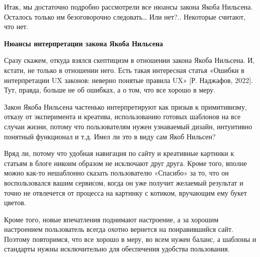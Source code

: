 Итак, мы достаточно подробно рассмотрели все нюансы закона Якоба Нильсена. Осталось только им безоговорочно следовать… Или нет?.. Некоторые считают, что нет.


\textbf{Нюансы интерпретации закона Якоба Нильсена}

Сразу скажем, откуда взялся скептицизм в отношении закона Якоба Нильсена. И, кстати, не только в отношении него. Есть такая интересная статья «Ошибки в интерпретации UX законов: неверно понятые правила UX» [Р. Наджафов, 2022]. Тут, правда, больше не об ошибках, а о том, что все хорошо в меру.

Закон Якоба Нильсена частенько интерпретируют как призыв к примитивизму, отказу от эксперимента и креатива, использованию готовых шаблонов на все случаи жизни, потому что пользователям нужен узнаваемый дизайн, интуитивно понятный функционал и т.д. Имел ли это в виду сам Якоб Нильсен?

Вряд ли, потому что удобная навигация по сайту и креативные картинки к статьям в блоге никоим образом не исключают друг друга. Кроме того, вполне можно как-то нешаблонно сказать пользователю «Спасибо» за то, что он воспользовался вашим сервисом, когда он уже получит желаемый результат и точно не отвлечется от процесса на картинку с котиком, вручающим ему букет цветов.

Кроме того, новые впечатления поднимают настроение, а за хорошим настроением пользователь всегда охотно вернется на понравившийся сайт. Поэтому повторимся, что все хорошо в меру, во всем нужен баланс, а шаблоны и стандарты нужны исключительно для обеспечения удобства пользования.
